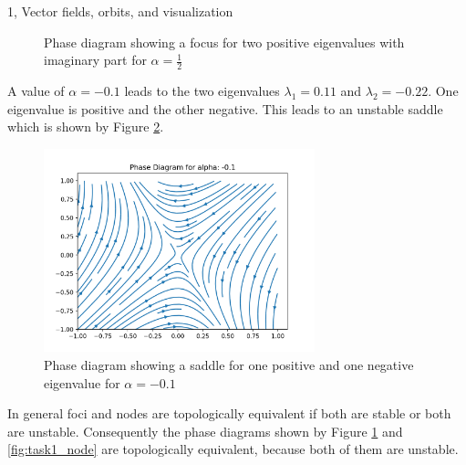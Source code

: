 \documentclass[10pt,a4paper]{article}
\begin{document}
\begin{task}{1, Vector fields, orbits, and visualization}
\begin{figure}[H]
    \caption{Phase diagram showing a focus for two positive eigenvalues with imaginary part for $\alpha = \frac{1}{2}$}
    \label{fig:task1_focus}
\end{figure}
A value of $\alpha=-0.1$ leads to the two eigenvalues $\lambda_1 = 0.11$ and $\lambda_2=-0.22$. One eigenvalue is positive and the other negative. This leads to an unstable saddle which is shown by Figure \ref{fig:task1_saddle}.
\begin{figure}[H]
    \centering
    \includegraphics[width=0.7\textwidth]{../plots/saddle.png}
    \caption{Phase diagram showing a saddle for one positive and one negative eigenvalue for $\alpha = -0.1$}
    \label{fig:task1_saddle}
\end{figure}
In general foci and nodes are topologically equivalent if both are stable or both are unstable. Consequently the phase diagrams shown by Figure \ref{fig:task1_focus} and \ref{fig:task1_node} are topologically equivalent, because both of them are unstable.
\end{task}
\end{document}
